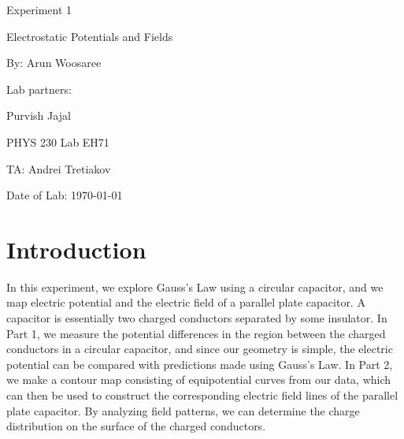 \documentclass[letterpaper]{article}
\begin{document}
  \begin{titlepage}
    \begin{center}
        \vspace*{1cm}
        \Huge
        Experiment 1
        \vspace{1cm}

        Electrostatic Potentials and Fields
        \vspace{1cm}

        By: Arun Woosaree
        \vspace{1cm}

        Lab partners:
        \vspace{.25cm}
        \Large

        Purvish Jajal


        \Huge
        PHYS 230 Lab EH71
        \vspace{1cm}

        TA: Andrei Tretiakov
        \vspace{1cm}

        Date of Lab: \today
        \vfill
    \end{center}
\end{titlepage}

\section{Introduction}

In this experiment, we explore Gauss's Law using a circular capacitor, and
we map electric potential and the electric field of a parallel plate capacitor.
A capacitor is essentially two charged conductors separated by some insulator.
In Part 1, we measure the potential differences in the region between the charged conductors in a circular capacitor,
and since our geometry is simple, the electric potential can be compared with
predictions made using Gauss's Law. In Part 2, we make a contour map consisting of equipotential
curves from our data, which can then be used to construct the corresponding electric field lines
of the parallel plate capacitor.
By analyzing field patterns, we can determine the charge distribution on the surface of
the charged conductors.
\end{document}
